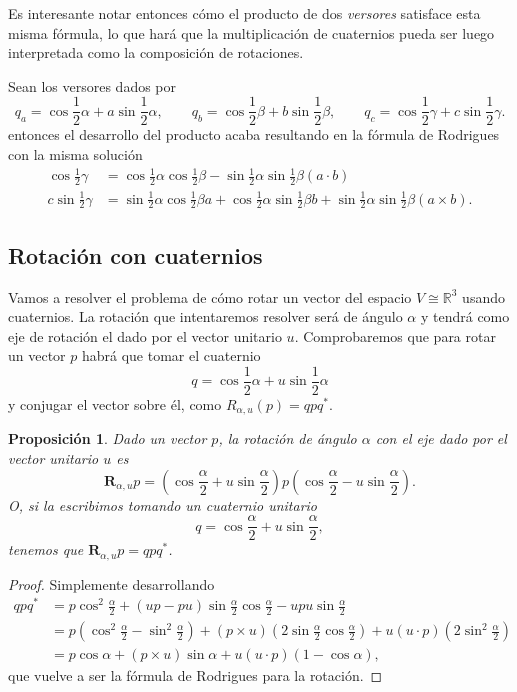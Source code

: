 \documentclass{article}
\theoremstyle{plain}
\newtheorem{proposition}{Proposición}
\theoremstyle{definition}
\theoremstyle{remark}
\begin{document}
Es interesante notar entonces cómo el producto de dos \textit{versores}
satisface esta misma fórmula, lo que hará que la multiplicación de
cuaternios pueda ser luego interpretada como la composición de
rotaciones.

Sean los versores dados por
\[
  q_a = \cos \frac{1}{2} \alpha + a \sin \frac{1}{2} \alpha,
  \qquad
  q_b = \cos \frac{1}{2} \beta + b \sin \frac{1}{2} \beta,
  \qquad
  q_c = \cos \frac{1}{2} \gamma + c \sin \frac{1}{2} \gamma.
\]
entonces el desarrollo del producto acaba resultando en la fórmula de
Rodrigues con la misma solución
\[\begin{aligned}
    \cos \frac{1}{2}\gamma &=
    \cos \frac{1}{2}\alpha \cos\frac{1}{2}\beta - \sin\frac{1}{2}\alpha\sin\frac{1}{2}\beta (a\cdot b)\\
    c\sin \frac{1}{2}\gamma &=
    \sin \frac{1}{2}\alpha \cos\frac{1}{2}\beta a +
    \cos \frac{1}{2}\alpha \sin\frac{1}{2}\beta b +
    \sin \frac{1}{2}\alpha \sin\frac{1}{2}\beta (a \times b).
  \end{aligned}\]

\subsection{Rotación con cuaternios}
Vamos a resolver el problema de cómo rotar un vector del espacio
$V \cong \mathbb{R}^3$ usando cuaternios. La rotación que intentaremos
resolver será de ángulo $\alpha$ y tendrá como eje de rotación el dado
por el vector unitario $u$. Comprobaremos que para rotar un vector $p$
habrá que tomar el cuaternio
\[q = \cos \frac{1}{2}\alpha + u \sin \frac{1}{2}\alpha\]
y conjugar el vector sobre él, como $R_{\alpha,u}(p) = qpq^\ast $.

\begin{proposition}
Dado un vector $p$, la rotación de ángulo $\alpha$ con el eje dado por
el vector unitario $u$ es
\[ \mathbf{R}_{\alpha,u}p =
  \left(\cos \frac{\alpha}{2} + u \sin \frac{\alpha}{2}\right)
  p
  \left(\cos \frac{\alpha}{2} - u \sin \frac{\alpha}{2}\right).\]
O, si la escribimos tomando un cuaternio unitario
\[
  q = \cos \frac{\alpha}{2} + u \sin \frac{\alpha}{2},
\]
tenemos que $\mathbf{R}_{\alpha,u}p = qpq^\ast $.
\end{proposition}
\begin{proof}
  Simplemente desarrollando
  \[\begin{aligned}
      qpq^\ast &=
      p \cos^2\frac{\alpha}{2} + (up-pu)\sin\frac{\alpha}{2}\cos\frac{\alpha}{2} - upu\sin\frac{\alpha}{2}
      \\&=
      p \left(\cos^2\frac{\alpha}{2} - \sin^2\frac{\alpha}{2} \right) +
      (p \times u)\left(2\sin\frac{\alpha}{2}\cos\frac{\alpha}{2}\right) +
      u(u\cdot p)\left(2\sin^2\frac{\alpha}{2}\right)
      \\&=
      p \cos\alpha +
      (p \times u)\sin\alpha +
      u(u\cdot p)\left(1 - \cos \alpha\right),
    \end{aligned}\]
  que vuelve a ser la fórmula de Rodrigues para la rotación.
\end{proof}
\end{document}
